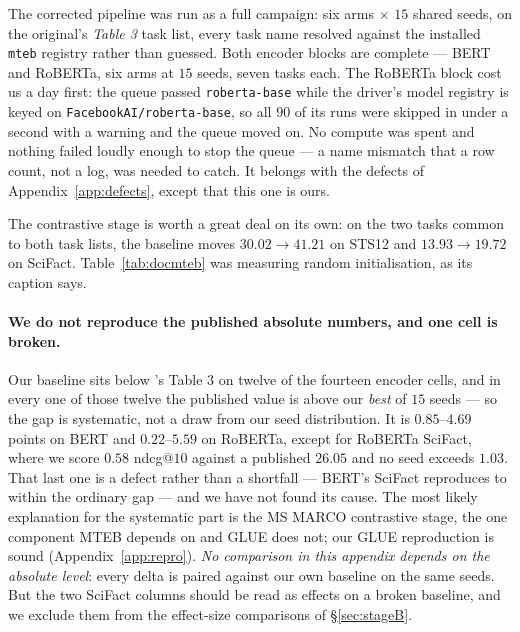 \documentclass{article}
\begin{document}
The corrected pipeline was run as a full campaign: six arms $\times$ $15$ shared
seeds, on the original's \emph{Table 3} task list, every task name resolved
against the installed \texttt{mteb} registry rather than guessed. Both encoder
blocks are complete --- BERT and RoBERTa, six arms at $15$ seeds, seven tasks
each. The RoBERTa block cost us a day first: the queue passed
\texttt{roberta-base} while the driver's model registry is keyed on
\texttt{FacebookAI/roberta-base}, so all $90$ of its runs were skipped in under
a second with a warning and the queue moved on. No compute was spent and nothing
failed loudly enough to stop the queue --- a name mismatch that a row count, not
a log, was needed to catch. It belongs with the defects of
Appendix~\ref{app:defects}, except that this one is ours.

The contrastive stage is worth a great deal on its own: on the two tasks common
to both task lists, the baseline moves $30.02 \rightarrow 41.21$ on STS12 and
$13.93 \rightarrow 19.72$ on SciFact. Table~\ref{tab:docmteb} was measuring
random initialisation, as its caption says.

\paragraph{We do not reproduce the published absolute numbers, and one cell is
broken.} Our baseline sits below \citet{mantri2026glot}'s Table 3 on twelve of
the fourteen encoder cells, and in every one of those twelve the published value
is above our \emph{best} of $15$ seeds --- so the gap is systematic, not a draw
from our seed distribution. It is $0.85$--$4.69$ points on BERT and
$0.22$--$5.59$ on RoBERTa, except for RoBERTa SciFact, where we score $0.58$
ndcg@$10$ against a published $26.05$ and no seed exceeds $1.03$. That last one
is a defect rather than a shortfall --- BERT's SciFact reproduces to within the
ordinary gap --- and we have not found its cause. The most likely explanation for
the systematic part is the MS MARCO contrastive stage, the one component MTEB
depends on and GLUE does not; our GLUE reproduction is sound
(Appendix~\ref{app:repro}). \emph{No comparison in this appendix depends on the
absolute level}: every delta is paired against our own baseline on the same
seeds. But the two SciFact columns should be read as effects on a broken
baseline, and we exclude them from the effect-size comparisons of
\S\ref{sec:stageB}.
\end{document}
